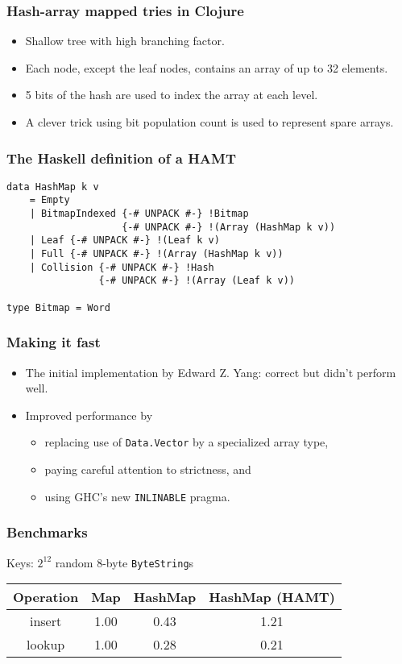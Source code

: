 \documentclass{beamer}
\begin{document}
\begin{frame}
  \frametitle{Hash-array mapped tries in Clojure}
  \begin{itemize}
  \item Shallow tree with high branching factor.
  \item Each node, except the leaf nodes, contains an array of up to
    32 elements.
  \item 5 bits of the hash are used to index the array at each level.
  \item A clever trick using bit population count is used to represent
    spare arrays.
  \end{itemize}
\end{frame}

\begin{frame}[fragile]
  \frametitle{The Haskell definition of a HAMT}
  \begin{lstlisting}
data HashMap k v
    = Empty
    | BitmapIndexed {-# UNPACK #-} !Bitmap
                    {-# UNPACK #-} !(Array (HashMap k v))
    | Leaf {-# UNPACK #-} !(Leaf k v)
    | Full {-# UNPACK #-} !(Array (HashMap k v))
    | Collision {-# UNPACK #-} !Hash
                {-# UNPACK #-} !(Array (Leaf k v))

type Bitmap = Word
  \end{lstlisting}
\end{frame}

\begin{frame}
  \frametitle{Making it fast}
  \begin{itemize}
  \item The initial implementation by Edward Z. Yang: correct but
    didn't perform well.
    \item Improved performance by
      \begin{itemize}
        \item replacing use of \lstinline!Data.Vector! by a
          specialized array type,
        \item paying careful attention to strictness, and
        \item using GHC's new \texttt{INLINABLE} pragma.
      \end{itemize}
  \end{itemize}
\end{frame}

\begin{frame}
  \frametitle{Benchmarks}

  Keys: $2^{12}$ random 8-byte \lstinline!ByteString!s

  \bigskip
  \begin{tabular}{|c|c|c|c|}
    \hline \textbf{Operation} & \textbf{Map} & \textbf{HashMap} &
    \textbf{HashMap (HAMT)} \\
    \hline insert & 1.00 & 0.43 & 1.21 \\
    \hline lookup & 1.00 & 0.28 & 0.21 \\
    \hline
  \end{tabular}
\end{frame}
\end{document}
